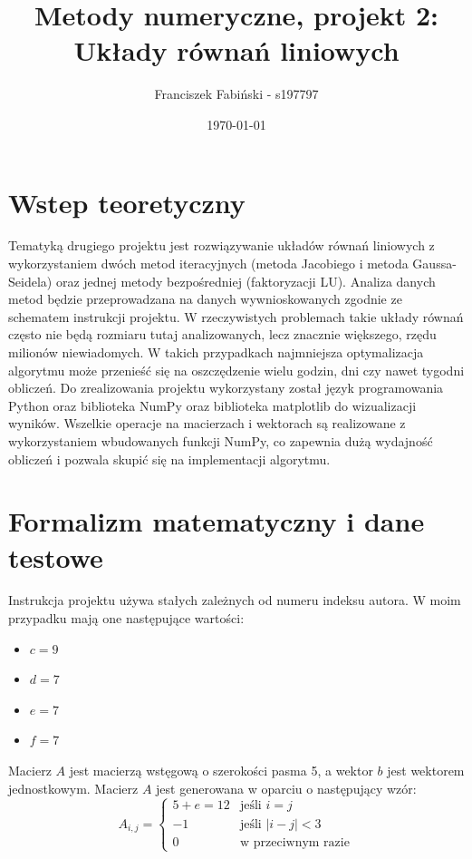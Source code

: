 \documentclass[a4paper,12pt]{article}  %
\title{Metody numeryczne, projekt 2:\\ Układy równań liniowych}
\author{Franciszek Fabiński - s197797}
\date{\today}
\begin{document}
\maketitle  %

\section{Wstep teoretyczny}

Tematyką drugiego projektu jest rozwiązywanie układów równań liniowych
z wykorzystaniem dwóch metod iteracyjnych (metoda Jacobiego i metoda Gaussa-Seidela) oraz
jednej metody bezpośredniej (faktoryzacji LU). Analiza danych metod będzie
przeprowadzana na danych wywnioskowanych zgodnie ze schematem instrukcji
projektu. 
\smallbreak
W rzeczywistych problemach takie układy równań często nie będą rozmiaru tutaj
analizowanych, lecz znacznie większego, rzędu milionów niewiadomych. W takich
przypadkach najmniejsza optymalizacja algorytmu może przenieść się na
oszczędzenie wielu godzin, dni czy nawet tygodni obliczeń.
\smallbreak
Do zrealizowania projektu wykorzystany został język programowania Python oraz
biblioteka NumPy oraz biblioteka matplotlib do wizualizacji wyników. Wszelkie
operacje na macierzach i wektorach są realizowane z wykorzystaniem
wbudowanych funkcji NumPy, co zapewnia dużą wydajność obliczeń i pozwala skupić
się na implementacji algorytmu.

\pagebreak
\section{Formalizm matematyczny i dane testowe}
Instrukcja projektu używa stałych zależnych od numeru indeksu autora. W
moim przypadku mają one następujące wartości:

\begin{itemize}
  \item $c = 9$
  \item $d = 7$
  \item $e = 7$
  \item $f = 7$
\end{itemize}

Macierz $A$ jest macierzą wstęgową o szerokości pasma 5, a wektor $b$ jest wektorem
jednostkowym. Macierz $A$ jest generowana w oparciu o następujący wzór:
\begin{equation}
    A_{i,j} = \begin{cases}
        5+e = 12 & \text{jeśli } i = j \\
        -1 & \text{jeśli } |i - j| < 3 \\
        0 & \text{w przeciwnym razie}
    \end{cases}
\end{equation}
\end{document}
